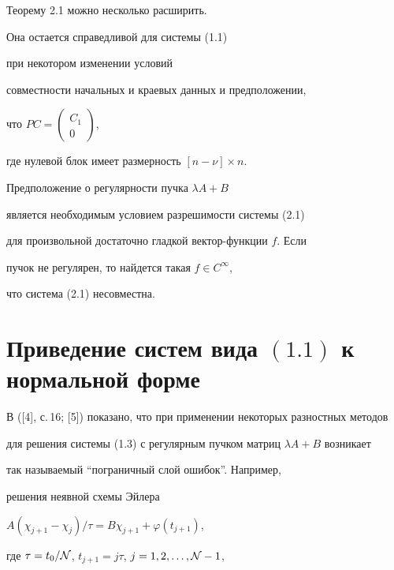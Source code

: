 \begin{notes}


Теорему 2.1 можно несколько расширить.


Она остается справедливой для системы (1.1)


при некотором изменении условий


совместности начальных и краевых данных и предположении,


что $PC=\left(\begin{smallmatrix} C_1\\ 0\end{smallmatrix}\right)$,


где нулевой блок имеет размерность $[n-\nu ]\times n$.


\end{notes}





\begin{notes}


Предположение о регулярности пучка $\lambda A+B$


является необходимым условием разрешимости системы (2.1)


для произвольной достаточно гладкой вектор-функции $f$. Если


пучок не регулярен, то найдется такая $f\in C^{\infty }$,


что система (2.1) несовместна.


\end{notes}








\section{Приведение систем вида $(1.1)$ к нормальной форме}





В ([4], с.\,16; [5]) показано, что при применении некоторых разностных методов 


для решения системы (1.3) с регулярным пучком матриц $\lambda A+B$ возникает


так называемый ``пограничный слой ошибок''. Например,


решения неявной схемы Эйлера


$A(\chi_{j+1}-\chi_j)/\tau =B\chi _{j+1}+\varphi (t_{j+1})$,


где $\tau =t_0/{\cal N}$, $t_{j+1}=j\tau$, $j=1,2,\dotsc,{\cal N}-1$,


